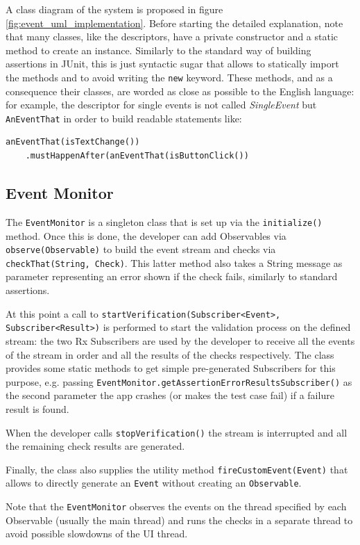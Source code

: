 \documentclass[11pt,a4paper,notitlepage]{article}
\begin{document}
A class diagram of the system is proposed in figure \ref{fig:event_uml_implementation}. Before starting the detailed explanation, note that many classes, like the descriptors, have a private constructor and a static method to create an instance. Similarly to the standard way of building assertions in JUnit, this is just syntactic sugar that allows to statically import the methods and to avoid writing the \texttt{new} keyword. These methods, and as a consequence their classes, are worded as close as possible to the English language: for example, the descriptor for single events is not called \textit{SingleEvent} but \texttt{AnEventThat} in order to build readable statements like:
\begin{lstlisting}
anEventThat(isTextChange())
	.mustHappenAfter(anEventThat(isButtonClick())
\end{lstlisting}

\subsection{Event Monitor}
The \texttt{EventMonitor} is a singleton class that is set up via the \texttt{initialize()} method. Once this is done, the developer can add Observables via \texttt{observe(Observable)} to build the event stream and checks via \texttt{checkThat(String, Check)}. This latter method also takes a String message as parameter representing an error shown if the check fails, similarly to standard assertions.

At this point a call to \texttt{startVerification(Subscriber<Event>, Subscriber<Result>)} is performed to start the validation process on the defined stream: the two Rx Subscribers are used by the developer to receive all the events of the stream in order and all the results of the checks respectively. The class provides some static methods to get simple pre-generated Subscribers for this purpose, e.g. passing \texttt{EventMonitor.getAssertionErrorResultsSubscriber()} as the second parameter the app crashes (or makes the test case fail) if a failure result is found.

When the developer calls \texttt{stopVerification()} the stream is interrupted and all the remaining check results are generated.

Finally, the class also supplies the utility method \texttt{fireCustomEvent(Event)} that allows to directly generate an \texttt{Event} without creating an \texttt{Observable}.

Note that the \texttt{EventMonitor} observes the events on the thread specified by each Observable (usually the main thread) and runs the checks in a separate thread to avoid possible slowdowns of the UI thread.
\end{document}
